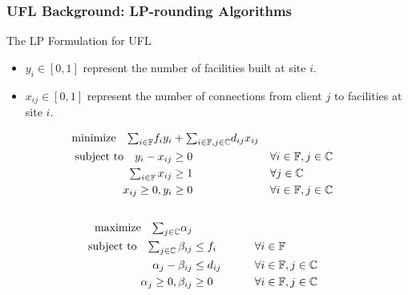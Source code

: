 \documentclass[handout, hyperref, xcolor=dvipsnames]{beamer}
\begin{document}
\begin{frame}
  \frametitle{UFL Background: LP-rounding Algorithms}

  The LP Formulation for UFL
  \begin{itemize}
  \item $y_i\in [0,1]$ represent the number of facilities built at site $i$.
  \item $x_{ij}\in [0,1]$ represent the number of connections from
    client $j$ to facilities at site $i$.
  \end{itemize}
  \begin{alignat}{3}
    \textrm{minimize}\quad \textstyle{\sum_{i\in \mathbb{F}}}f_iy_i &+ \textstyle{\sum_{i\in \mathbb{F}, j\in \mathbb{C}}}d_{ij}x_{ij}&\label{eqn:fac_primal}
    \\ \notag
    \textrm{subject to}\quad y_i - x_{ij} &\geq 0  & &\forall i\in \mathbb{F}, j\in \mathbb{C} 
    \\ \notag
    \textstyle{\sum_{i\in \mathbb{F}} x_{ij}} &\geq 1 & &\forall j\in \mathbb{C}
    \\ \notag
    x_{ij} \geq 0, y_i &\geq 0 & &\forall i\in \mathbb{F}, j\in \mathbb{C} 
    \\ \notag
  \end{alignat}
  \begin{alignat}{3}
    \textrm{maximize}\quad \textstyle{\sum_{j\in \mathbb{C}}} \alpha_j&\label{eqn:fac_dual}  
    \\ \notag
    \textrm{subject to} \quad \textstyle{
      \sum_{j\in \mathbb{C}}\beta_{ij}} &\leq f_i  &\quad\quad			&\forall i \in \mathbb{F}  
    \\ \notag
    \alpha_{j} - \beta_{ij} 	&\leq  d_{ij}       &                 & \forall i\in \mathbb{F}, j\in \mathbb{C} 
    \\ \notag
    \alpha_j \geq 0, \beta_{ij} &\geq 0           &            & \forall i\in \mathbb{F}, j\in \mathbb{C}
  \end{alignat}
\end{frame}
\end{document}
